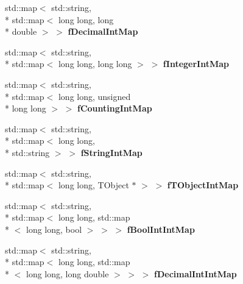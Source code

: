 \begin{DoxyCompactItemize}
\item 
\hypertarget{class_h_a_l_1_1_analysis_data_a526269757b7fc50679f71ca9d8c32200}{std\-::map$<$ std\-::string, \\*
std\-::map$<$ long long, long \\*
double $>$ $>$ {\bfseries f\-Decimal\-Int\-Map}}\label{class_h_a_l_1_1_analysis_data_a526269757b7fc50679f71ca9d8c32200}

\item 
\hypertarget{class_h_a_l_1_1_analysis_data_a6d00ff54958b91f9a52352cd5215c20b}{std\-::map$<$ std\-::string, \\*
std\-::map$<$ long long, long long $>$ $>$ {\bfseries f\-Integer\-Int\-Map}}\label{class_h_a_l_1_1_analysis_data_a6d00ff54958b91f9a52352cd5215c20b}

\item 
\hypertarget{class_h_a_l_1_1_analysis_data_a95c2fc353e8135665cb2f2425b7d1222}{std\-::map$<$ std\-::string, \\*
std\-::map$<$ long long, unsigned \\*
long long $>$ $>$ {\bfseries f\-Counting\-Int\-Map}}\label{class_h_a_l_1_1_analysis_data_a95c2fc353e8135665cb2f2425b7d1222}

\item 
\hypertarget{class_h_a_l_1_1_analysis_data_a01d886fea1d274f4d2332becb338bd56}{std\-::map$<$ std\-::string, \\*
std\-::map$<$ long long, \\*
std\-::string $>$ $>$ {\bfseries f\-String\-Int\-Map}}\label{class_h_a_l_1_1_analysis_data_a01d886fea1d274f4d2332becb338bd56}

\item 
\hypertarget{class_h_a_l_1_1_analysis_data_a1a4d8de38ea3d6f6668da4a1952cf5c9}{std\-::map$<$ std\-::string, \\*
std\-::map$<$ long long, T\-Object $\ast$ $>$ $>$ {\bfseries f\-T\-Object\-Int\-Map}}\label{class_h_a_l_1_1_analysis_data_a1a4d8de38ea3d6f6668da4a1952cf5c9}

\item 
\hypertarget{class_h_a_l_1_1_analysis_data_ae77e4da8d3132624828f920ba97b4fb7}{std\-::map$<$ std\-::string, \\*
std\-::map$<$ long long, std\-::map\\*
$<$ long long, bool $>$ $>$ $>$ {\bfseries f\-Bool\-Int\-Int\-Map}}\label{class_h_a_l_1_1_analysis_data_ae77e4da8d3132624828f920ba97b4fb7}

\item 
\hypertarget{class_h_a_l_1_1_analysis_data_aefc075e5018270fb349aaa3d8b292cfe}{std\-::map$<$ std\-::string, \\*
std\-::map$<$ long long, std\-::map\\*
$<$ long long, long double $>$ $>$ $>$ {\bfseries f\-Decimal\-Int\-Int\-Map}}\label{class_h_a_l_1_1_analysis_data_aefc075e5018270fb349aaa3d8b292cfe}


\end{DoxyCompactItemize}
